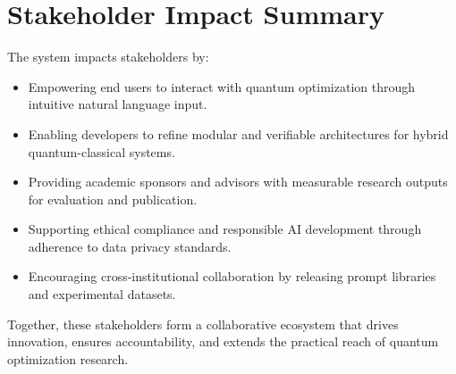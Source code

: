 \section{Stakeholder Impact Summary}

The system impacts stakeholders by:
\begin{itemize}
    \item Empowering end users to interact with quantum optimization through intuitive natural language input.
    \item Enabling developers to refine modular and verifiable architectures for hybrid quantum-classical systems.
    \item Providing academic sponsors and advisors with measurable research outputs for evaluation and publication.
    \item Supporting ethical compliance and responsible AI development through adherence to data privacy standards.
    \item Encouraging cross-institutional collaboration by releasing prompt libraries and experimental datasets.
\end{itemize}

\bigskip
\noindent
Together, these stakeholders form a collaborative ecosystem that drives innovation, ensures accountability, and extends the practical reach of quantum optimization research.
